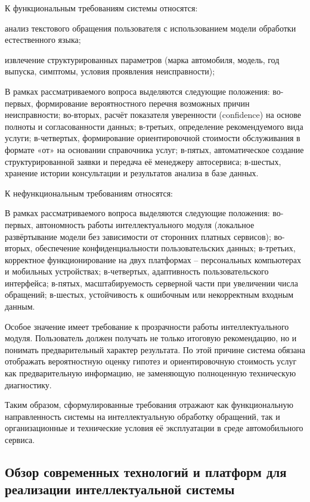 \documentclass[14pt,a4paper]{extarticle}
\numberwithin{figure}{section}
\numberwithin{table}{section}
\begin{document}
К функциональным требованиям системы относятся:

анализ текстового обращения пользователя с использованием модели
обработки естественного языка;

извлечение структурированных параметров (марка автомобиля, модель, год
выпуска, симптомы, условия проявления неисправности);


В рамках рассматриваемого вопроса выделяются следующие положения: во-первых, формирование вероятностного перечня возможных причин неисправности; во-вторых, расчёт показателя уверенности (confidence) на основе полноты и согласованности данных; в-третьих, определение рекомендуемого вида услуги; в-четвертых, формирование ориентировочной стоимости обслуживания в формате «от» на основании справочника услуг; в-пятых, автоматическое создание структурированной заявки и передача её менеджеру автосервиса; в-шестых, хранение истории консультации и результатов анализа в базе данных.


К нефункциональным требованиям относятся:


В рамках рассматриваемого вопроса выделяются следующие положения: во-первых, автономность работы интеллектуального модуля (локальное развёртывание модели без зависимости от сторонних платных сервисов); во-вторых, обеспечение конфиденциальности пользовательских данных; в-третьих, корректное функционирование на двух платформах -- персональных компьютерах и мобильных устройствах; в-четвертых, адаптивность пользовательского интерфейса; в-пятых, масштабируемость серверной части при увеличении числа обращений; в-шестых, устойчивость к ошибочным или некорректным входным данным.


Особое значение имеет требование к прозрачности работы интеллектуального
модуля. Пользователь должен получать не только итоговую рекомендацию, но
и понимать предварительный характер результата. По этой причине система
обязана отображать вероятностную оценку гипотез и ориентировочную
стоимость услуг как предварительную информацию, не заменяющую
полноценную техническую диагностику.

Таким образом, сформулированные требования отражают как функциональную
направленность системы на интеллектуальную обработку обращений, так и
организационные и технические условия её эксплуатации в среде
автомобильного сервиса.

\subsection{Обзор современных технологий и платформ для реализации
интеллектуальной
системы}\label{ux43eux431ux437ux43eux440-ux441ux43eux432ux440ux435ux43cux435ux43dux43dux44bux445-ux442ux435ux445ux43dux43eux43bux43eux433ux438ux439-ux438-ux43fux43bux430ux442ux444ux43eux440ux43c-ux434ux43bux44f-ux440ux435ux430ux43bux438ux437ux430ux446ux438ux438-ux438ux43dux442ux435ux43bux43bux435ux43aux442ux443ux430ux43bux44cux43dux43eux439-ux441ux438ux441ux442ux435ux43cux44b}
\end{document}
